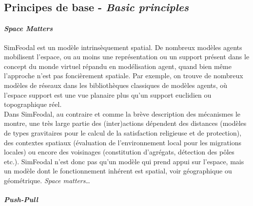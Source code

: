 \subsection{Principes de base - \textit{Basic principles}}

\paragraph{\textit{Space Matters}}

SimFeodal est un modèle intrinsèquement spatial.
De nombreux modèles agents mobilisent l'espace, ou au moins une représentation ou un support présent dans le concept du \og monde\fg{} virtuel répandu en modélisation agent, quand bien même l'approche n'est pas foncièrement spatiale.
Par exemple, on trouve de nombreux modèles de réseaux dans les bibliothèques classiques de modèles agents, où l'espace support est une vue planaire plus qu'un support euclidien ou topographique réel.\\
Dans SimFeodal, au contraire et comme la brève description des mécanismes le montre, une très large partie des (inter)actions dépendent des distances (modèles de types gravitaires pour le calcul de la satisfaction religieuse et de protection), des contextes spatiaux (évaluation de l'environnement local pour les migrations locales) ou encore des voisinages (constitution d'agrégats, détection des pôles etc.).
SimFeodal n'est donc pas qu'un modèle qui prend appui sur l'espace, mais un modèle dont le fonctionnement inhérent est spatial, voir géographique ou géométrique.
\textit{Space matters}\ldots

\paragraph{\textit{Push-Pull}}

